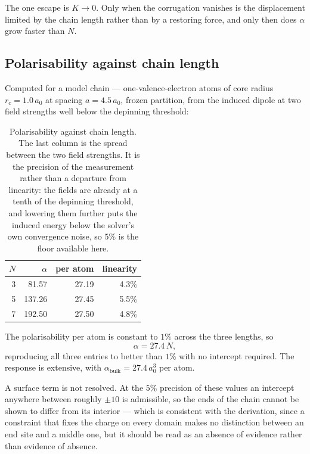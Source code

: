 \documentclass[11pt]{article}
\begin{document}
The one escape is $K \to 0$. Only when the corrugation vanishes is the displacement limited by the
chain length rather than by a restoring force, and only then does $\alpha$ grow faster than $N$.

\subsection{Polarisability against chain length}

Computed for a model chain --- one-valence-electron atoms of core
radius $r_c=1.0\,a_0$ at spacing $a=4.5\,a_0$, frozen partition, from the induced dipole at two
field strengths well below the depinning threshold:

\begin{table}[h]
\centering
\begin{tabular}{rrrr}
\toprule
$N$ & $\alpha$ & per atom & linearity \\
\midrule
3 & 81.57 & 27.19 & 4.3\% \\
5 & 137.26 & 27.45 & 5.5\% \\
7 & 192.50 & 27.50 & 4.8\% \\
\bottomrule
\end{tabular}
\caption{Polarisability against chain length. The last column is the spread between the two field
strengths. It is the precision of the measurement rather than a departure from linearity: the
fields are already at a tenth of the depinning threshold, and lowering them further puts the
induced energy below the solver's own convergence noise, so $5\%$ is the floor available here.}
\label{tab:chainN}
\end{table}

The polarisability per atom is constant to $1\%$ across the three lengths, so
\begin{equation}
\alpha = 27.4\,N,
\label{eq:alphafit}
\end{equation}
reproducing all three entries to better than $1\%$ with no intercept required. The response is
extensive, with $\alpha_{\text{bulk}} = 27.4\,a_0^3$ per atom.

A surface term is not resolved. At the $5\%$ precision of these values an intercept anywhere
between roughly $\pm 10$ is admissible, so the ends of the chain cannot be shown to differ from its
interior --- which is consistent with the derivation, since a constraint that fixes the charge on
every domain makes no distinction between an end site and a middle one, but it should be read as
an absence of evidence rather than evidence of absence.
\end{document}
